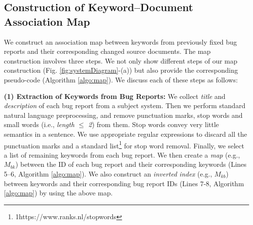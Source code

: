 \documentclass[conference]{IEEEtran}
\begin{document}
\subsection{Construction of Keyword--Document Association Map}\label{sec:MapConstruction}
We construct an association map between keywords from previously fixed bug reports and their corresponding changed source documents.
The map construction involves three steps.
We not only show different steps of our map construction  (Fig. \ref{fig:systemDiagram}-(a)) but also provide the corresponding pseudo-code (Algorithm \ref{algo:map}). We discuss each of these steps as follows:



\textbf{(1) Extraction of Keywords from Bug Reports:} We collect \emph{title} and \emph{description} of each bug report from a subject system.  
Then we perform standard natural language preprocessing, and remove punctuation marks, stop words and small words (i.e., \emph{length $\le$ 2}) from them. Stop words convey very little semantics in a sentence. 
We use appropriate regular expressions to discard all the punctuation marks and 
a standard list\footnote{{1}https://www.ranks.nl/stopwords} for stop word removal. 
Finally, we select a list of remaining keywords from each bug report. 
We then create a \emph{map} (e.g., $M_{bk}$) between the ID of each bug report and their corresponding keywords (Lines 5--6, Algorithm \ref{algo:map}).   
We also construct an \emph{inverted index} (e.g., $M_{kb}$) between keywords and their corresponding bug report IDs (Lines 7-8, Algorithm \ref{algo:map}) by using the above map.



\end{document}
